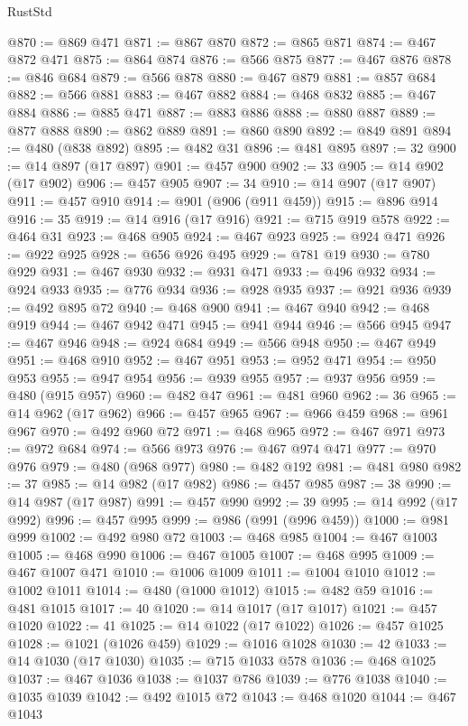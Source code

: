 \begin{lexlean}{RustStd}
\begin{coremodule}
@870 := @869 @471
@871 := @867 @870
@872 := @865 @871
@874 := @467 @872 @471
@875 := @864 @874
@876 := @566 @875
@877 := @467 @876
@878 := @846 @684
@879 := @566 @878
@880 := @467 @879
@881 := @857 @684
@882 := @566 @881
@883 := @467 @882
@884 := @468 @832
@885 := @467 @884
@886 := @885 @471
@887 := @883 @886
@888 := @880 @887
@889 := @877 @888
@890 := @862 @889
@891 := @860 @890
@892 := @849 @891
@894 := @480 (@838 @892)
@895 := @482 @31
@896 := @481 @895
@897 := 32
@900 := @14 @897 (@17 @897)
@901 := @457 @900
@902 := 33
@905 := @14 @902 (@17 @902)
@906 := @457 @905
@907 := 34
@910 := @14 @907 (@17 @907)
@911 := @457 @910
@914 := @901 (@906 (@911 @459))
@915 := @896 @914
@916 := 35
@919 := @14 @916 (@17 @916)
@921 := @715 @919 @578
@922 := @464 @31
@923 := @468 @905
@924 := @467 @923
@925 := @924 @471
@926 := @922 @925
@928 := @656 @926 @495
@929 := @781 @19
@930 := @780 @929
@931 := @467 @930
@932 := @931 @471
@933 := @496 @932
@934 := @924 @933
@935 := @776 @934
@936 := @928 @935
@937 := @921 @936
@939 := @492 @895 @72
@940 := @468 @900
@941 := @467 @940
@942 := @468 @919
@944 := @467 @942 @471
@945 := @941 @944
@946 := @566 @945
@947 := @467 @946
@948 := @924 @684
@949 := @566 @948
@950 := @467 @949
@951 := @468 @910
@952 := @467 @951
@953 := @952 @471
@954 := @950 @953
@955 := @947 @954
@956 := @939 @955
@957 := @937 @956
@959 := @480 (@915 @957)
@960 := @482 @47
@961 := @481 @960
@962 := 36
@965 := @14 @962 (@17 @962)
@966 := @457 @965
@967 := @966 @459
@968 := @961 @967
@970 := @492 @960 @72
@971 := @468 @965
@972 := @467 @971
@973 := @972 @684
@974 := @566 @973
@976 := @467 @974 @471
@977 := @970 @976
@979 := @480 (@968 @977)
@980 := @482 @192
@981 := @481 @980
@982 := 37
@985 := @14 @982 (@17 @982)
@986 := @457 @985
@987 := 38
@990 := @14 @987 (@17 @987)
@991 := @457 @990
@992 := 39
@995 := @14 @992 (@17 @992)
@996 := @457 @995
@999 := @986 (@991 (@996 @459))
@1000 := @981 @999
@1002 := @492 @980 @72
@1003 := @468 @985
@1004 := @467 @1003
@1005 := @468 @990
@1006 := @467 @1005
@1007 := @468 @995
@1009 := @467 @1007 @471
@1010 := @1006 @1009
@1011 := @1004 @1010
@1012 := @1002 @1011
@1014 := @480 (@1000 @1012)
@1015 := @482 @59
@1016 := @481 @1015
@1017 := 40
@1020 := @14 @1017 (@17 @1017)
@1021 := @457 @1020
@1022 := 41
@1025 := @14 @1022 (@17 @1022)
@1026 := @457 @1025
@1028 := @1021 (@1026 @459)
@1029 := @1016 @1028
@1030 := 42
@1033 := @14 @1030 (@17 @1030)
@1035 := @715 @1033 @578
@1036 := @468 @1025
@1037 := @467 @1036
@1038 := @1037 @786
@1039 := @776 @1038
@1040 := @1035 @1039
@1042 := @492 @1015 @72
@1043 := @468 @1020
@1044 := @467 @1043

\end{coremodule}
\end{lexlean}
